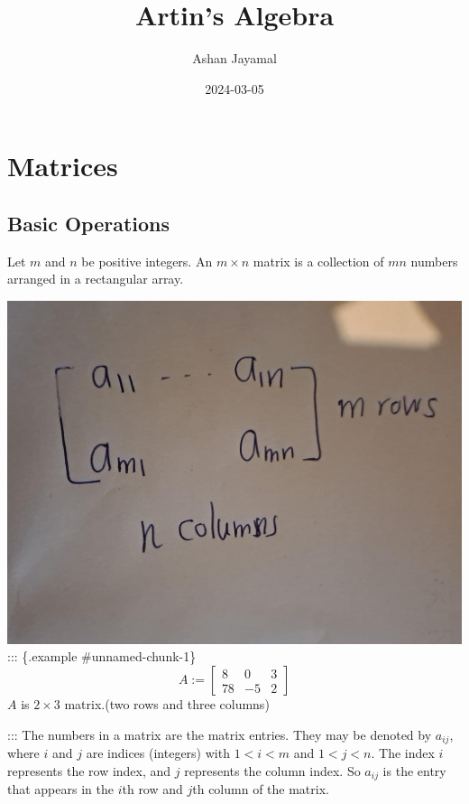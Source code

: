 \documentclass[
]{book}
\title{Artin's Algebra}
\author{Ashan Jayamal}
\date{2024-03-05}
\theoremstyle{definition}
\theoremstyle{definition}
\theoremstyle{definition}
\theoremstyle{definition}
\theoremstyle{remark}
\begin{document}
\maketitle

{
\setcounter{tocdepth}{1}
\tableofcontents
}
\hypertarget{matrices}{%
\chapter{Matrices}\label{matrices}}

\hypertarget{basic-operations}{%
\section{Basic Operations}\label{basic-operations}}

Let \(m\) and \(n\) be positive integers. An \(m \times n\) matrix is a collection of \(mn\) numbers arranged in a rectangular array.

\includegraphics{figures/ch_1/fig01.jpg}
::: \{.example \#unnamed-chunk-1\}
\[A:=\begin{bmatrix}
8 & 0 & 3\\
78 & -5 & 2
\end{bmatrix}\]
\(A\) is \(2 \times 3\) matrix.(two rows and three columns)

:::
The numbers in a matrix are the matrix entries. They may be denoted by \(a_{ij}\), where \(i\) and \(j\) are indices (integers) with \(1 < i < m\) and \(1 < j < n\). The index \(i\) represents the row index, and \(j\) represents the column index. So \(a_{ij}\) is the entry that appears in the \(i\)th row and \(j\)th column of the matrix.
\end{document}
